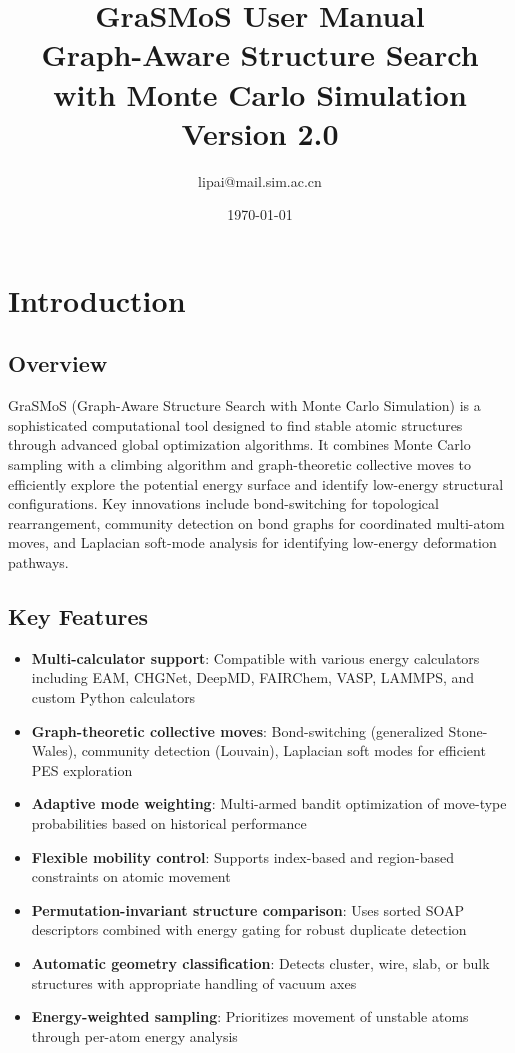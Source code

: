 \documentclass[11pt,a4paper]{article}
\title{\textbf{GraSMoS User Manual}\\
\large Graph-Aware Structure Search with Monte Carlo Simulation\\
Version 2.0}
\author{lipai@mail.sim.ac.cn}
\date{\today}
\begin{document}
\maketitle
\tableofcontents
\newpage

\section{Introduction}

\subsection{Overview}
GraSMoS (Graph-Aware Structure Search with Monte Carlo Simulation) is a sophisticated computational tool designed to find stable atomic structures through advanced global optimization algorithms. It combines Monte Carlo sampling with a climbing algorithm and graph-theoretic collective moves to efficiently explore the potential energy surface and identify low-energy structural configurations. Key innovations include bond-switching for topological rearrangement, community detection on bond graphs for coordinated multi-atom moves, and Laplacian soft-mode analysis for identifying low-energy deformation pathways.

\subsection{Key Features}
\begin{itemize}
    \item \textbf{Multi-calculator support}: Compatible with various energy calculators including EAM, CHGNet, DeepMD, FAIRChem, VASP, LAMMPS, and custom Python calculators
    \item \textbf{Graph-theoretic collective moves}: Bond-switching (generalized Stone-Wales), community detection (Louvain), Laplacian soft modes for efficient PES exploration
    \item \textbf{Adaptive mode weighting}: Multi-armed bandit optimization of move-type probabilities based on historical performance
    \item \textbf{Flexible mobility control}: Supports index-based and region-based constraints on atomic movement
    \item \textbf{Permutation-invariant structure comparison}: Uses sorted SOAP descriptors combined with energy gating for robust duplicate detection
    \item \textbf{Automatic geometry classification}: Detects cluster, wire, slab, or bulk structures with appropriate handling of vacuum axes
    \item \textbf{Energy-weighted sampling}: Prioritizes movement of unstable atoms through per-atom energy analysis
\end{itemize}
\end{document}
